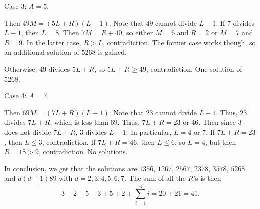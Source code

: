 Case 3: $A=5$.

Then $49M=\left(5L+R\right)\left(L-1\right)$. Note that $49$ cannot divide $L-1$. If $7$ divides $L-1$, then $L=8$. Then $7M=R+40$, so either $M=6$ and $R=2$ or $M=7$ and $R=9$. In the latter case, $R>L$, contradiction. The former case works though, so an additional solution of $5268$ is gained.

Otherwise, $49$ divides $5L+R$, so $5L+R\geq49$, contradiction. One solution of $5268$.

Case 4: $A=7$.

Then $69M=\left(7L+R\right)\left(L-1\right)$. Note that $23$ cannot divide $L-1$. Thus, $23$ divides $7L+R$, which is less than $69$. Thus, $7L+R=23$ or $46$. Then since $3$ does not divide $7L+R$, $3$ divides $L-1$. In particular, $L=4$ or $7$. If $7L+R=23$, then $L\leq3$, contradiction. If $7L+R=46$, then $L\leq 6$, so $L=4$, but then $R=18>9$, contradiction. No solutions.

In conclusion, we get that the solutions are $1356$, $1267$, $2567$, $2378$, $3578$, $5268$, and $\underline{d\left(d-1\right)89}$ with $d=2,3,4,5,6,7$. The sum of all the $R$'s is then \[3+2+5+3+5+2+\displaystyle\sum_{i=1}^6i=20+21=\boxed{41}.\]